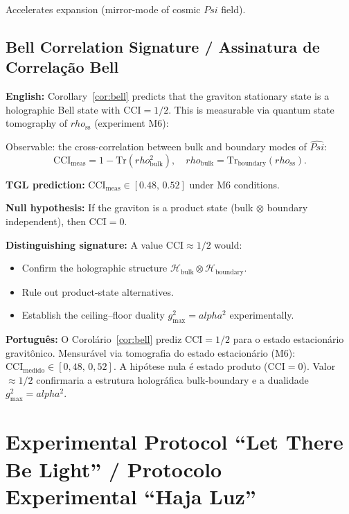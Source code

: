 \documentclass[12pt,a4paper]{article}
\def\Psi{Psi}%
\def\alpha{alpha}%
\def\rho{rho}%
\begin{document}
Accelerates expansion (mirror-mode of cosmic $\Psi$ field).

\subsection{Bell Correlation Signature / Assinatura de Correlação Bell}

\textbf{English:} Corollary~\ref{cor:bell} predicts that the graviton stationary state is a holographic Bell state with $\mathrm{CCI} = 1/2$. This is measurable via quantum state tomography of $\rho_{\mathrm{ss}}$ (experiment M6):

Observable: the cross-correlation between bulk and boundary modes of $\hat{\Psi}$:
\begin{equation}
\mathrm{CCI}_{\mathrm{meas}} = 1 - \mathrm{Tr}(\rho_{\mathrm{bulk}}^2), \quad
\rho_{\mathrm{bulk}} = \mathrm{Tr}_{\mathrm{boundary}}(\rho_{\mathrm{ss}}).
\end{equation}

\textbf{TGL prediction:} $\mathrm{CCI}_{\mathrm{meas}} \in [0.48,\, 0.52]$ under M6 conditions.

\textbf{Null hypothesis:} If the graviton is a product state (bulk $\otimes$ boundary independent), then $\mathrm{CCI} = 0$.

\textbf{Distinguishing signature:} A value $\mathrm{CCI} \approx 1/2$ would:
\begin{itemize}
    \item Confirm the holographic structure $\mathcal{H}_{\mathrm{bulk}} \otimes \mathcal{H}_{\mathrm{boundary}}$.
    \item Rule out product-state alternatives.
    \item Establish the ceiling--floor duality $g_{\max}^2 = \alpha^2$ experimentally.
\end{itemize}

\textbf{Português:} O Corolário~\ref{cor:bell} prediz $\mathrm{CCI} = 1/2$ para o estado estacionário gravitônico. Mensurável via tomografia do estado estacionário (M6): $\mathrm{CCI}_{\text{medido}} \in [0{,}48,\, 0{,}52]$. A hipótese nula é estado produto ($\mathrm{CCI}=0$). Valor $\approx 1/2$ confirmaria a estrutura holográfica bulk-boundary e a dualidade $g_{\max}^2 = \alpha^2$.


\section{Experimental Protocol ``Let There Be Light'' / Protocolo Experimental ``Haja Luz''}
\end{document}
